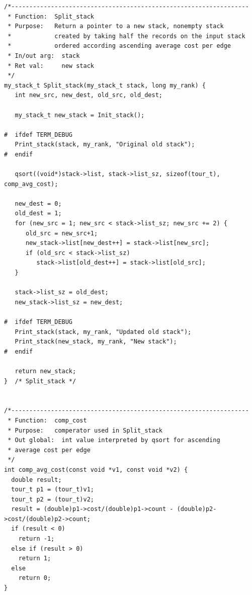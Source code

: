 \documentclass[a4paper,11pt,twoside]{article}
\begin{document}
\begin{verbatim}
/*------------------------------------------------------------------
 * Function:  Split_stack
 * Purpose:   Return a pointer to a new stack, nonempty stack
 *            created by taking half the records on the input stack
 *            ordered according ascending average cost per edge
 * In/out arg:  stack
 * Ret val:     new stack
 */
my_stack_t Split_stack(my_stack_t stack, long my_rank) {
   int new_src, new_dest, old_src, old_dest;
   
   my_stack_t new_stack = Init_stack();
   
#  ifdef TERM_DEBUG
   Print_stack(stack, my_rank, "Original old stack");
#  endif

   qsort((void*)stack->list, stack->list_sz, sizeof(tour_t), comp_avg_cost);

   new_dest = 0;
   old_dest = 1;
   for (new_src = 1; new_src < stack->list_sz; new_src += 2) {
      old_src = new_src+1;
      new_stack->list[new_dest++] = stack->list[new_src];
      if (old_src < stack->list_sz) 
         stack->list[old_dest++] = stack->list[old_src];
   }

   stack->list_sz = old_dest;
   new_stack->list_sz = new_dest;

#  ifdef TERM_DEBUG
   Print_stack(stack, my_rank, "Updated old stack");
   Print_stack(new_stack, my_rank, "New stack");
#  endif

   return new_stack;
}  /* Split_stack */


/*------------------------------------------------------------------           
 * Function:  comp_cost
 * Purpose:   comperator used in Split_stack
 * Out global:  int value interpreted by qsort for ascending
 * average cost per edge
 */
int comp_avg_cost(const void *v1, const void *v2) {
  double result;
  tour_t p1 = (tour_t)v1;
  tour_t p2 = (tour_t)v2;
  result = (double)p1->cost/(double)p1->count - (double)p2->cost/(double)p2->count;
  if (result < 0)
    return -1;
  else if (result > 0)
    return 1;
  else
    return 0;
}
\end{verbatim}
\end{document}

